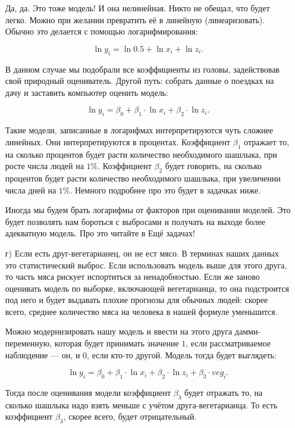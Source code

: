 \documentclass[12pt, a4paper, oneside]{article}
\theoremstyle{plain} %
\theoremstyle{definition}
\begin{document}
\begin{solution}
\begin{enumerate}
		Да, да. Это тоже модель! И она нелинейная. Никто не обещал, что будет легко. Можно при желании превратить её в линейную (линеаризовать). Обычно это делается с помощью логарифмирования: 
		
		\[ \ln y_i = \ln 0.5 + \ln x_i + \ln z_i.\]
		
		В данном случае мы подобрали все коэффициенты из головы, задействовав свой природный оцениватель. Другой путь: собрать данные о поездках на дачу и заставить компьютер оценить модель: 
		
		\[ \ln y_i = \beta_0 + \beta_1 \cdot \ln x_i + \beta_2 \cdot \ln z_i.\]
		
		Такие модели, записанные в логарифмах интерпретируются чуть сложнее линейных. Они интерпретируются в процентах. Коэффициент $\beta_1$ отражает то, на сколько процентов будет расти количество необходимого шашлыка, при росте числа людей на $1\%$. Коэффициент $\beta_2$ будет говорить, на сколько процентов будет расти количество необходимого шашлыка, при увеличении числа дней на $1\%$. Немного подробнее про это будет в задачках ниже.
		
		Иногда мы будем брать логарифмы от факторов при оценивании моделей. Это будет позволять нам бороться с выбросами и получать на выходе более адекватную модель. Про это читайте в Ещё задачах! 
		
		\item[г)]   Если есть друг-вегетарианец, он не ест мясо. В терминах наших данных это статистический выброс. Если использовать модель выше для этого друга, то часть мяса рискует испортиться за ненадобностью. Если же заново оценивать модель по выборке, включающей вегетарианца, то она подстроится под него и будет выдавать плохие прогнозы для обычных людей: скорее всего, среднее количество мяса на человека в нашей формуле уменьшится. 
		
		Можно модернизировать нашу модель и ввести на этого друга дамми-переменную, которая будет принимать значение $1$, если рассматриваемое наблюдение --- он, и $0$, если кто-то другой. Модель тогда будет выглядеть: 
		
		\[ \ln y_i = \beta_0 + \beta_1 \cdot \ln x_i + \beta_2 \cdot \ln z_i + \beta_3 \cdot veg_i.\]
		
		Тогда после оценивания модели коэффициент $\beta_3$ будет отражать то, на сколько шашлыка надо взять меньше с учётом друга-вегетарианца. То есть коэффициент $\beta_3$, скорее всего, будет отрицательный.

	\end{enumerate}	
	

\end{solution}
\end{document}
